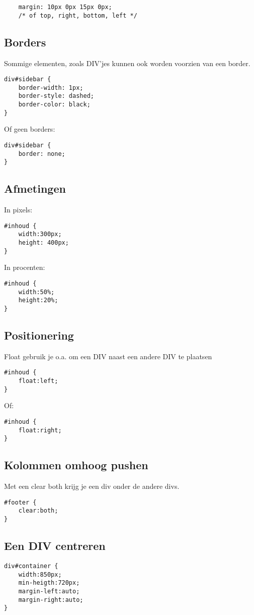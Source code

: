 \documentclass[8pt,pagesize,footinclude=false,headinclude=false]{scrartcl}
\begin{document}
\begin{multicols*}{4}
\begin{lstlisting}
	margin: 10px 0px 15px 0px; 
	/* of top, right, bottom, left */
\end{lstlisting}

\subsection*{Borders}
Sommige elementen, zoals DIV'jes kunnen ook worden voorzien van een border.
\begin{lstlisting}
div#sidebar {
	border-width: 1px;
	border-style: dashed;
	border-color: black;
}
\end{lstlisting}

\noindent Of geen borders:

\begin{lstlisting}
div#sidebar {
	border: none;
}
\end{lstlisting}

\subsection*{Afmetingen}
In pixels:
\begin{lstlisting}
#inhoud {
	width:300px;
	height: 400px;
}
\end{lstlisting}

\noindent In procenten:
\begin{lstlisting}
#inhoud {
	width:50%;
	height:20%;
}
\end{lstlisting}

\subsection*{Positionering}
Float gebruik je o.a. om een DIV naast een andere DIV te plaatsen
\begin{lstlisting}
#inhoud {
	float:left;
}
\end{lstlisting}
\noindent Of:
\begin{lstlisting}
#inhoud {
	float:right;
}
\end{lstlisting}

\subsection*{Kolommen omhoog pushen}
Met een clear both krijg je een div onder de andere divs.
\begin{lstlisting}
#footer {
	clear:both;
}
\end{lstlisting}

\subsection*{Een DIV centreren}
\begin{lstlisting}
div#container {
	width:850px;
	min-heigth:720px;
	margin-left:auto;
	margin-right:auto;
}
\end{lstlisting}


\end{multicols*}
\end{document}
